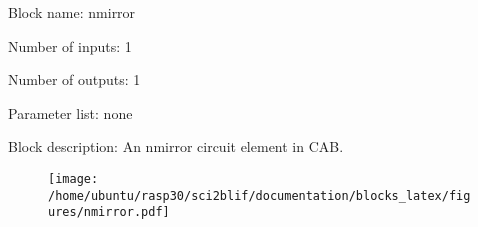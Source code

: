 \pagebreak

Block name: nmirror

Number of inputs: 1

Number of outputs: 1

Parameter list: none

Block description: 
An nmirror circuit element in CAB.

\begin{figure}[H]  %
\texttt{[image: /home/ubuntu/rasp30/sci2blif/documentation/blocks\_latex/figures/nmirror.pdf]}
\end{figure}

